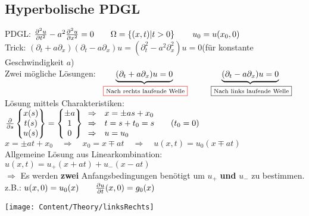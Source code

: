 \subsection{Hyperbolische PDGL}
\begin{minipage}{14cm}
	PDGL: $\frac{\partial ^2u}{\partial t^2}-a^2\frac{\partial ^2 u}{\partial x^2}=0\qquad \Omega=\left\{(x,t)|t>0\right\}\qquad u_0=u(x_0,0)$\\
	
	Trick: $(\partial_t +a\partial_x)(\partial_t-a\partial_x)u=(\partial_t^2-a^2\partial_x^2)u=0$\qquad(für konstante Geschwindigkeit $a$)\\
	
	Zwei mögliche Lösungen: $\underset{\text{\cfbox{red}{Nach rechts laufende Welle}}}{\underbrace{(\partial_t +a\partial_x)u=0}}\qquad \underset{\text{\cfbox{black}{Nach links laufende Welle}}}{\underbrace{(\partial_t-a\partial_x)u=0}}$\\
	
	Lösung mittels Charakteristiken: $\frac{\partial }{\partial s}
	\begin{Bmatrix}
		x(s)\\
		t(s)\\
		u(s)
	\end{Bmatrix}=
	\begin{Bmatrix}
		\pm a\\
		1\\
		0
	\end{Bmatrix}
	\begin{array}{ll}
		\Rightarrow&x=\pm as +x_0\\
		\Rightarrow&t= s +t_0=s\qquad (t_0=0)\\
		\Rightarrow&u=u_0\\
	\end{array}
	$\\
	
	$x=\pm at+x_0\quad\Rightarrow\quad x_0=x\mp at\quad\Rightarrow\quad u(x,t)=u_0(x\mp at)$\\
	
	Allgemeine Lösung aus Linearkombination: $\boxed{u(x,t)=u_+(x+at)+u_-(x-at)}$\\
	
	$\Rightarrow$ Es werden \textbf{zwei} Anfangsbedingungen benötigt um $u_+$ \textbf{und} $u_-$ zu bestimmen.\\
	
	z.B.: $u(x,0)=u_0(x)\qquad \frac{\partial u}{\partial t}(x,0)=g_0(x)$
	\end{minipage}
	\hfill
	\begin{minipage}{5cm}
	\texttt{[image: Content/Theory/linksRechts]}
	\end{minipage}